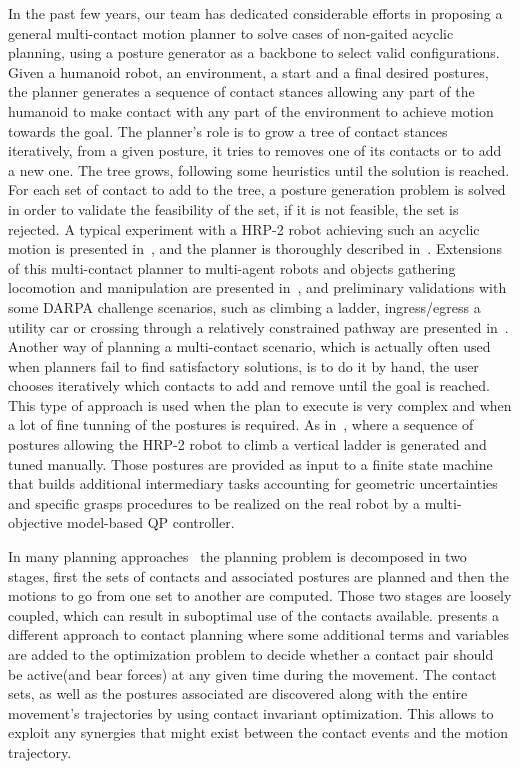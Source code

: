 In the past few years, our team has dedicated considerable efforts in proposing a general multi-contact motion planner to solve cases of non-gaited acyclic planning, using a posture generator as a backbone to select valid configurations.
Given a humanoid robot, an environment, a start and a final desired postures, the planner generates a sequence of contact stances allowing any part of the humanoid to make contact with any part of the environment to achieve motion towards the goal.
The planner's role is to grow a tree of contact stances iteratively, from a given posture, it tries to removes one of its contacts or to add a new one.
The tree grows, following some heuristics until the solution is reached.
For each set of contact to add to the tree, a posture generation problem is solved in order to validate the feasibility of the set, if it is not feasible, the set is rejected.
A typical experiment with a HRP-2 robot achieving such an acyclic motion is presented in~\cite{escande:iser:2008}, and the planner is thoroughly described in~\cite{escande:ras:2013}.
Extensions of this multi-contact planner to multi-agent robots and objects gathering locomotion and manipulation are presented in~\cite{bouyarmane:ar:2012}, and preliminary validations with some DARPA challenge scenarios, such as climbing a ladder, ingress/egress a utility car or crossing through a relatively constrained pathway are presented in~\cite{bouyarmane:humanoids:2012}.
Another way of planning a multi-contact scenario, which is actually often used when planners fail to find satisfactory solutions, is to do it by hand, the user chooses iteratively which contacts to add and remove until the goal is reached.
This type of approach is used when the plan to execute is very complex and when a lot of fine tunning of the postures is required.
As in~\cite{vaillant:autonomousrobots:2016}, where a sequence of postures allowing the HRP-2 robot to climb a vertical ladder is generated and tuned manually.
Those postures are provided as input to a finite state machine that builds additional intermediary tasks accounting for geometric uncertainties and specific grasps procedures to be realized on the real robot by a multi-objective model-based QP controller.

In many planning approaches~\cite{kuffner2005motion, chestnutt2007navigation, hauser:ijrr:2008, kolter2008control, bouyarmane:icra:2011} the planning problem is decomposed in two stages, first the sets of contacts and associated postures are planned and then the motions to go from one set to another are computed.
Those two stages are loosely coupled, which can result in suboptimal use of the contacts available.
\cite{mordatch:acm:2012} presents a different approach to contact planning where some additional terms and variables are added to the optimization problem to decide whether a contact pair should be active(and bear forces) at any given time during the movement.
The contact sets, as well as the postures associated are discovered along with the entire movement's trajectories by using contact invariant optimization.
This allows to exploit any synergies that might exist between the contact events and the motion trajectory.

